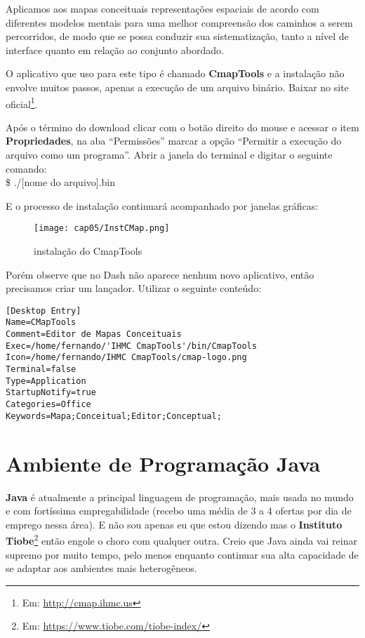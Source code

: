 Aplicamos aos mapas conceituais representações espaciais de acordo com diferentes modelos mentais para uma melhor compreensão dos caminhos a serem percorridos, de modo que se possa conduzir sua sistematização, tanto a nível de interface quanto em relação ao conjunto abordado.

O aplicativo que uso para este tipo é chamado \textbf{CmapTools} e a instalação não envolve muitos passos, apenas a execução de um arquivo binário. Baixar no site oficial\footnote{Em: \url{http://cmap.ihmc.us}}.

Após o término do download clicar com o botão direito do mouse e acessar o item \textbf{Propriedades}, na aba ``Permissões'' marcar a opção ``Permitir a execução do arquivo como um programa''. Abrir a janela do terminal e digitar o seguinte comando: \\
{\ttfamily\$ ./[nome do arquivo].bin}

E o processo de instalação continuará acompanhado por janelas gráficas:
\begin{figure}[H]
\centering\texttt{[image: cap05/InstCMap.png]}
\caption{instalação do CmapTools}
\end{figure}

Porém observe que no Dash não aparece nenhum novo aplicativo, então precisamos criar um lançador. Utilizar o seguinte conteúdo:
\begin{lstlisting}
[Desktop Entry]
Name=CMapTools
Comment=Editor de Mapas Conceituais
Exec=/home/fernando/'IHMC CmapTools'/bin/CmapTools
Icon=/home/fernando/IHMC CmapTools/cmap-logo.png
Terminal=false
Type=Application
StartupNotify=true
Categories=Office
Keywords=Mapa;Conceitual;Editor;Conceptual;
\end{lstlisting}

\section{Ambiente de Programação Java}
\textbf{Java} é atualmente a principal linguagem de programação, mais usada no mundo e com fortíssima empregabilidade (recebo uma média de 3 a 4 ofertas por dia de emprego nessa área). E não sou apenas eu que estou dizendo mas o \textbf{Instituto Tiobe}\footnote{Em: \url{https://www.tiobe.com/tiobe-index/}} então engole o choro com qualquer outra. Creio que Java ainda vai reinar supremo por muito tempo, pelo menos enquanto continuar sua alta capacidade de se adaptar aos ambientes mais heterogêneos.


